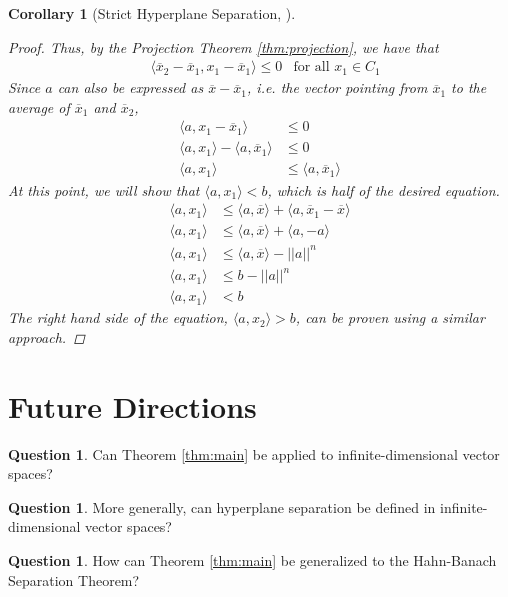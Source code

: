 \documentclass[11pt,reqno]{amsart}
\theoremstyle{plain}
\newtheorem{corollary}[theorem]{Corollary}
\theoremstyle{definition}
\newtheorem{question}[theorem]{Question}
\begin{document}
{\begin{corollary}[{Strict Hyperplane Separation, \cite[1.5.3]{bertsekas2009convex}}]
\begin{proof}
        Thus, by the Projection Theorem \ref{thm:projection}, we have that
        \begin{align*}
            &\langle \overline{x}_2 - \overline{x}_1, x_1 - \overline{x}_1\rangle \leq 0 &\text{for all $x_1\in C_1$}
        \end{align*}
        Since $a$ can also be expressed as $\overline{x} - \overline{x}_1$, \emph{i.e.} the vector pointing from $\overline{x}_1$ to the average of $\overline{x}_1$ and $\overline{x}_2$,
        \begin{align*}
            \langle a,x_1-\overline{x}_1\rangle &\leq 0\\
            \langle a,x_1\rangle - \langle a,\overline{x}_1\rangle &\leq 0\\
            \langle a,x_1\rangle &\leq \langle a,\overline{x}_1\rangle
        \end{align*}
        At this point, we will show that $\langle a,x_1\rangle < b$, which is half of the desired equation.
        \begin{align*}
            \langle a,x_1\rangle &\leq \langle a,\overline{x}\rangle + \langle a,\overline{x}_1 - \overline{x}\rangle\\
            \langle a,x_1\rangle &\leq \langle a,\overline{x}\rangle + \langle a,-a\rangle\\
            \langle a,x_1\rangle &\leq \langle a,\overline{x}\rangle - ||a||^n\\
            \langle a,x_1\rangle &\leq b - ||a||^n\\
            \langle a,x_1\rangle &< b
        \end{align*}
        The right hand side of the equation, $\langle a,x_2\rangle > b$, can be proven using a similar approach.
    \end{proof}
\end{corollary}
}

\section{Future Directions}
\label{sec:futuredirections}
{
\setlength{\parskip}{8pt}
\begin{question}
    Can Theorem \ref{thm:main} be applied to infinite-dimensional vector spaces?
\end{question}

\begin{question}
    More generally, can hyperplane separation be defined in infinite-dimensional vector spaces?
\end{question}

\begin{question}
    How can Theorem \ref{thm:main} be generalized to the Hahn-Banach Separation Theorem?
\end{question}
}

\nocite{*}


\end{document}
